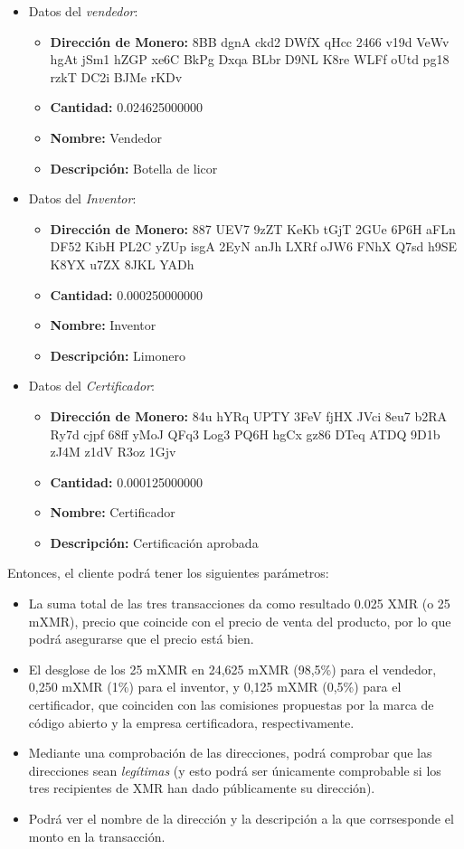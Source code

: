 \documentclass[12pt,a4paper]{article}
\begin{document}
\begin{itemize}
\item Datos del \textit{vendedor}:
	\begin{itemize}
	\item \textbf{Dirección de Monero:} 8BB dgnA ckd2 DWfX qHcc 2466 v19d VeWv hgAt jSm1 hZGP xe6C BkPg Dxqa BLbr D9NL K8re WLFf oUtd pg18 rzkT DC2i BJMe rKDv
	\item \textbf{Cantidad:} 0.024625000000
	\item \textbf{Nombre:} Vendedor
	\item \textbf{Descripción:} Botella de licor
	\end{itemize}
\item Datos del \textit{Inventor}:
	\begin{itemize}
	\item \textbf{Dirección de Monero:} 887 UEV7 9zZT KeKb tGjT 2GUe 6P6H aFLn DF52 KibH PL2C yZUp isgA 2EyN anJh LXRf oJW6 FNhX Q7sd h9SE K8YX u7ZX 8JKL YADh
	\item \textbf{Cantidad:} 0.000250000000
	\item \textbf{Nombre:} Inventor
	\item \textbf{Descripción:} Limonero
	\end{itemize}
\item Datos del \textit{Certificador}:
	\begin{itemize}
	\item \textbf{Dirección de Monero:} 84u hYRq UPTY 3FeV fjHX JVci 8eu7 b2RA Ry7d cjpf 68ff yMoJ QFq3 Log3 PQ6H hgCx gz86 DTeq ATDQ 9D1b zJ4M z1dV R3oz 1Gjv 
	\item \textbf{Cantidad:} 0.000125000000
	\item \textbf{Nombre:} Certificador
	\item \textbf{Descripción:} Certificación aprobada
	\end{itemize}
\end{itemize}

Entonces, el cliente podrá tener los siguientes parámetros:

\begin{itemize}
\item La suma total de las tres transacciones da como resultado 0.025 XMR (o 25 mXMR), precio que coincide con el precio de venta del producto, por lo que podrá asegurarse que el precio está bien.
\item El desglose de los 25 mXMR en 24,625 mXMR (98,5\%) para el vendedor, 0,250 mXMR (1\%) para el inventor, y 0,125 mXMR (0,5\%) para el certificador, que coinciden con las comisiones propuestas por la marca de código abierto y la empresa certificadora, respectivamente.
\item Mediante una comprobación de las direcciones, podrá comprobar que las direcciones sean \textit{legítimas} (y esto podrá ser únicamente comprobable si los tres recipientes de XMR han dado públicamente su dirección).
\item Podrá ver el nombre de la dirección y la descripción a la que corrsesponde el monto en la transacción.
\end{itemize}
\end{document}
